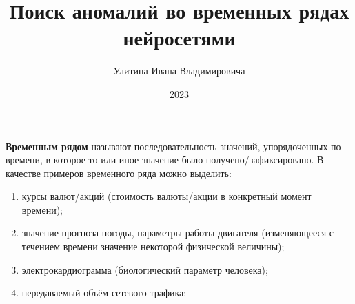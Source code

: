 \documentclass[bachelor, och, referat]{../shiza}
\begin{document}

\title{Поиск аномалий во временных рядах нейросетями}






\author{Улитина Ивана Владимировича}


\date{2023}

\maketitle


\tableofcontents

\intro

    \textbf{Временным рядом} называют последовательность значений, упорядоченных
    по времени, в которое то или иное значение было получено/зафиксировано. В
    качестве примеров временного ряда можно выделить:

    \begin{enumerate}
        \item курсы валют/акций (стоимость валюты/акции в конкретный момент
        времени);
        \item значение прогноза погоды, параметры работы двигателя (изменяющееся
        с течением времени значение некоторой физической величины);
        \item электрокардиограмма (биологический параметр человека);
        \item передаваемый объём сетевого трафика;
    \end{enumerate}
\end{document}
